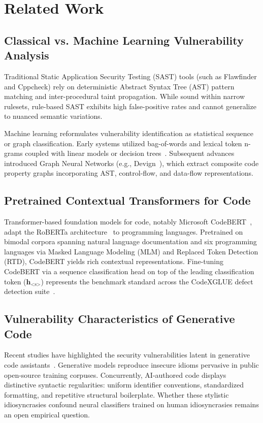 \documentclass[conference]{IEEEtran}
\begin{document}
\section{Related Work}

\subsection{Classical vs. Machine Learning Vulnerability Analysis}
Traditional Static Application Security Testing (SAST) tools (such as Flawfinder and Cppcheck) rely on deterministic Abstract Syntax Tree (AST) pattern matching and inter-procedural taint propagation. While sound within narrow rulesets, rule-based SAST exhibits high false-positive rates and cannot generalize to nuanced semantic variations.

Machine learning reformulates vulnerability identification as statistical sequence or graph classification. Early systems utilized bag-of-words and lexical token n-grams coupled with linear models or decision trees~\cite{scikit-learn}. Subsequent advances introduced Graph Neural Networks (e.g., Devign~\cite{zhou2019devign}), which extract composite code property graphs incorporating AST, control-flow, and data-flow representations.

\subsection{Pretrained Contextual Transformers for Code}
Transformer-based foundation models for code, notably Microsoft CodeBERT~\cite{feng2020codebert}, adapt the RoBERTa architecture~\cite{liu2019roberta} to programming languages. Pretrained on bimodal corpora spanning natural language documentation and six programming languages via Masked Language Modeling (MLM) and Replaced Token Detection (RTD), CodeBERT yields rich contextual representations. Fine-tuning CodeBERT via a sequence classification head on top of the leading classification token ($\mathbf{h}_{\text{<s>}}$) represents the benchmark standard across the CodeXGLUE defect detection suite~\cite{lu2021codexglue}.

\subsection{Vulnerability Characteristics of Generative Code}
Recent studies have highlighted the security vulnerabilities latent in generative code assistants~\cite{pearce2022asleep, secodeplt2024}. Generative models reproduce insecure idioms pervasive in public open-source training corpuses. Concurrently, AI-authored code displays distinctive syntactic regularities: uniform identifier conventions, standardized formatting, and repetitive structural boilerplate. Whether these stylistic idiosyncrasies confound neural classifiers trained on human idiosyncrasies remains an open empirical question.
\end{document}
